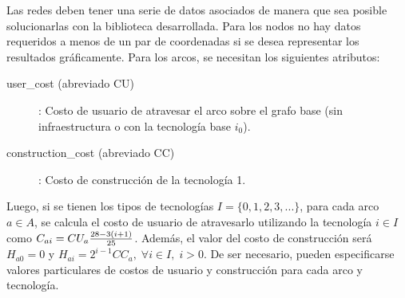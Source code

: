 Las redes deben tener una serie de datos asociados de manera que sea posible solucionarlas con la biblioteca desarrollada. Para los nodos no hay datos requeridos a menos de un par de coordenadas si se desea representar los resultados gráficamente. Para los arcos, se necesitan los siguientes atributos:

\begin{description}
\item[user\_cost (abreviado CU)]: Costo de usuario de atravesar el arco sobre el grafo base (sin infraestructura o con la tecnología base $i_0$).
\item[construction\_cost (abreviado CC)]: Costo de construcción de la tecnología 1.
\end{description}

Luego, si se tienen los tipos de tecnologías $I = \{0, 1, 2, 3, ... \}$, para cada arco $a \in A$, se calcula el costo de usuario de atravesarlo utilizando la tecnología $i \in I$ como $C_{ai} = CU_a { 28 - 3 (i + 1) \over 25}$. Además, el valor del costo de construcción será $H_{a0} = 0$ y $H_{ai} = 2^{i-1} CC_a,\; \forall i\in I,\; i > 0$. De ser necesario, pueden especificarse valores particulares de costos de usuario y construcción para cada arco y tecnología.
